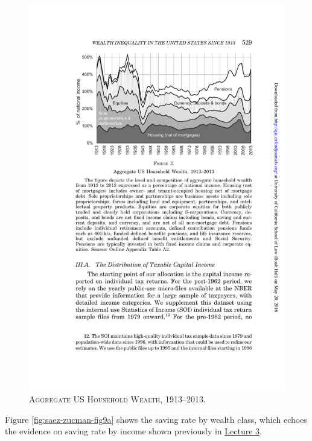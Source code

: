 \documentclass[]{book}
\theoremstyle{definition}
\theoremstyle{definition}
\theoremstyle{definition}
\theoremstyle{remark}
\begin{document}
\begin{figure}

{\centering \includegraphics[width=1\linewidth]{figures/fig2-nolegend2} 

}

\caption{\textsc{Aggregate US Household Wealth,
1913--2013}.}\label{fig:saez-zucman-fig2}
\end{figure}

Figure \ref{fig:saez-zucman-fig9a} shows the saving rate by wealth
class, which echoes the evidence on saving rate by income shown
previously in \protect\hyperlink{two-period}{Lecture 3}.
\end{document}
